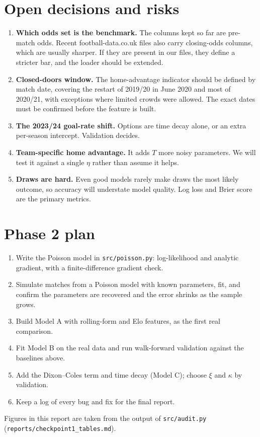\documentclass[12pt,a4paper]{article}
\begin{document}
\section{Open decisions and risks}

\begin{enumerate}
\item \textbf{Which odds set is the benchmark.} The columns kept so far are pre-match odds. Recent
football-data.co.uk files also carry closing-odds columns, which are usually sharper. If they are
present in our files, they define a stricter bar, and the loader should be extended.
\item \textbf{Closed-doors window.} The home-advantage indicator should be defined by match date,
covering the restart of 2019/20 in June 2020 and most of 2020/21, with exceptions where limited
crowds were allowed. The exact dates must be confirmed before the feature is built.
\item \textbf{The 2023/24 goal-rate shift.} Options are time decay alone, or an extra per-season
intercept. Validation decides.
\item \textbf{Team-specific home advantage.} It adds $T$ more noisy parameters. We will test it
against a single $\eta$ rather than assume it helps.
\item \textbf{Draws are hard.} Even good models rarely make draws the most likely outcome, so
accuracy will understate model quality. Log loss and Brier score are the primary metrics.
\end{enumerate}

\section{Phase 2 plan}

\begin{enumerate}
\item Write the Poisson model in \texttt{src/poisson.py}: log-likelihood and analytic gradient,
with a finite-difference gradient check.
\item Simulate matches from a Poisson model with known parameters, fit, and confirm the parameters are
recovered and the error shrinks as the sample grows.
\item Build Model A with rolling-form and Elo features, as the first real comparison.
\item Fit Model B on the real data and run walk-forward validation against the baselines above.
\item Add the Dixon--Coles term and time decay (Model C); choose $\xi$ and $\kappa$ by validation.
\item Keep a log of every bug and fix for the final report.
\end{enumerate}

\vspace{0.5em}
\begin{center}
\small\color{gray} Figures in this report are taken from the output of \texttt{src/audit.py}
(\texttt{reports/checkpoint1\_tables.md}).
\end{center}
\end{document}
